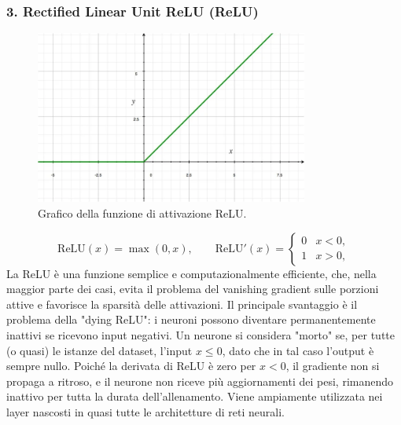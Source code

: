 \documentclass[a4paper,12pt]{report}
\begin{document}
	\subsubsection{3. Rectified Linear Unit ReLU (ReLU)}
	\begin{figure}[H]
		\centering
		\includegraphics[width=0.8\textwidth]{img/relu.png}
		\caption{Grafico della funzione di attivazione ReLU.}
	\end{figure}
	\[
	\mathrm{ReLU}(x)=\max(0,x),\qquad
	\mathrm{ReLU}'(x)=\begin{cases}0 & x<0,\\ 1 & x>0,\end{cases}
	\]
	La ReLU è una funzione semplice e computazionalmente efficiente, che, nella maggior parte dei casi, evita il problema del vanishing gradient sulle porzioni attive e favorisce la sparsità delle attivazioni. Il principale svantaggio è il problema della "dying ReLU": i neuroni possono diventare permanentemente inattivi se ricevono input negativi. Un neurone si considera "morto" se, per tutte (o quasi) le istanze del dataset, l'input $x \le 0$, dato che in tal caso l'output è sempre nullo. Poiché la derivata di ReLU è zero per $x<0$, il gradiente non si propaga a ritroso, e il neurone non riceve più aggiornamenti dei pesi, rimanendo inattivo per tutta la durata dell'allenamento. Viene ampiamente utilizzata nei layer nascosti in quasi tutte le architetture di reti neurali.
	
\end{document}
